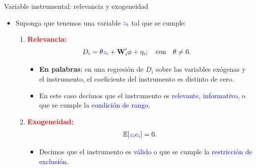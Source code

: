 \documentclass[10pt, xcolor=dvipsnames]{beamer}
\begin{document}
\begin{frame}{Variable instrumental: relevancia y exogeneidad}
\begin{itemize}
    \item Suponga que tenemos una variable $\textcolor{blue}{z_i}$ tal que se cumple: %
    \smallspace
    \begin{enumerate}
        \item \textcolor{red}{\textbf{Relevancia:}}
    \begin{align*}
    \begin{split}
        D_i &= \theta \textcolor{blue}{z_i} + \textbf{W}'_i \mathbf{\phi} + \eta_{i}; \hspace{1em} \text{con} \hspace{1em} \theta \neq 0.
    \end{split}
    \end{align*}
    \vspace{-1em}
    \begin{itemize}
        \item \textbf{En palabras}: en una regresión de $D_i$ sobre las variables exógenas y el instrumento, el coeficiente del instrumento es distinto de cero.
        \smallspace
        \item En este caso decimos que el instrumento es \textcolor{blue}{relevante}, \textcolor{blue}{informativo}, o que se cumple la \textcolor{blue}{condición de rango}. %
    \end{itemize}
    \vspace{1em}
	\item \textcolor{red}{\textbf{Exogeneidad:}}
	\begin{align*}
	\operatorname{\mathbb{E}}[\textcolor{blue}{z_i}e_i]=0.
	\end{align*}
	\vspace{-0.5cm}
	\begin{itemize}
		\item Decimos que el instrumento es \textcolor{blue}{válido} o que se cumple la \textcolor{blue}{restricción de exclusión}.
	\end{itemize}
    \end{enumerate}
\end{itemize}
\end{frame}
\end{document}

